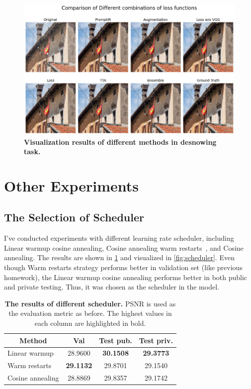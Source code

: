 \documentclass[10pt,twocolumn,letterpaper]{article}
\begin{document}
\begin{figure}[h]
  \centering
  \includegraphics[width=0.95\linewidth]{assets/result-desnow.png}
  \caption{\textbf{Visualization results of different methods in desnowing task.}}
  \label{fig:result-desnow}
\end{figure}



\section*{Other Experiments}
\label{sec:other-exp}

\subsection*{The Selection of Scheduler}

I've conducted experiments with different learning rate scheduler, including
Linear warmup cosine annealing, Cosine annealing warm restarts~\cite{CosineAnnealing},
and Cosine annealing. The results are shown in \cref{tab:scheduler} and visualized in
\cref{fig:scheduler}. Even though Warm restarts strategy performs better in validation
set (like previous homework), the Linear warmup cosine annealing performs better in
both public and private testing. Thus, it was chosen as the scheduler in the model.

\begin{table}[h]
  \centering
  \begin{tabular}{lccc}
    \toprule
    \multicolumn{1}{c}{\textbf{Method}}   & \textbf{Val}    & \textbf{Test pub.} & \textbf{Test priv.} \\
    \midrule
    Linear warmup                         & 28.9600          & \textbf{30.1508}    & \textbf{29.3773}  \\
    Warm restarts                         & \textbf{29.1132} & 29.8701             & 29.1540           \\
    Cosine annealing                      & 28.8869          & 29.8357             & 29.1742           \\ 
    \bottomrule
  \end{tabular}
  \caption{\textbf{The results of different scheduler.} PSNR is used as the
    evaluation metric as before. The highest values in each column are highlighted
    in bold.}
  \label{tab:scheduler}
\end{table}
\end{document}
